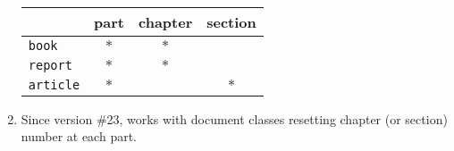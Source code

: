 \documentclass[12pt,a4paper]{book}
\begin{document}
\begin{enumerate}
\begin{center}\tt
\begin{tabular}{|l|c|c|c|}
\hline
&\bf part&\bf chapter&\bf section\vphantom{\Large Pj}\\\hline
\tt book&$*$&$*$&\vphantom{\Large Pj}\\\hline
\tt report&$*$&$*$&\vphantom{\Large Pj}\\\hline
\tt article&$*$&&$*$\vphantom{\Large Pj}\\\hline
\end{tabular}
\end{center}
\item Since version \#23, works with document classes resetting
     chapter (or section) number at each part.
\end{enumerate}
\end{document}
